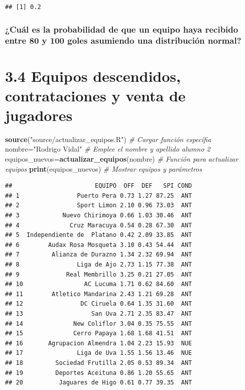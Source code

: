 \documentclass[]{article}
\newenvironment{Shaded}{\begin{snugshade}}{\end{snugshade}}
\newcommand{\CommentTok}[1]{\textcolor[rgb]{0.56,0.35,0.01}{\textit{#1}}}
\newcommand{\KeywordTok}[1]{\textcolor[rgb]{0.13,0.29,0.53}{\textbf{#1}}}
\newcommand{\NormalTok}[1]{#1}
\newcommand{\StringTok}[1]{\textcolor[rgb]{0.31,0.60,0.02}{#1}}
\begin{document}
\begin{verbatim}
## [1] 0.2
\end{verbatim}

\hypertarget{cual-es-la-probabilidad-de-que-un-equipo-haya-recibido-entre-80-y-100-goles-asumiendo-una-distribucion-normal}{%
\subsubsection{¿Cuál es la probabilidad de que un equipo haya recibido
entre 80 y 100 goles asumiendo una distribución
normal?}\label{cual-es-la-probabilidad-de-que-un-equipo-haya-recibido-entre-80-y-100-goles-asumiendo-una-distribucion-normal}}

\hypertarget{equipos-descendidos-contrataciones-y-venta-de-jugadores}{%
\section{3.4 Equipos descendidos, contrataciones y venta de
jugadores}\label{equipos-descendidos-contrataciones-y-venta-de-jugadores}}

\begin{Shaded}
\begin{Highlighting}[numbers=left,,]
\KeywordTok{source}\NormalTok{(}\StringTok{"source/actualizar_equipos.R"}\NormalTok{) }\CommentTok{# Cargar función específia}
\NormalTok{nombre=}\StringTok{"Rodrigo Vidal"} \CommentTok{# Emplee el nombre y apellido alumno 2}
\NormalTok{equipos_nuevos=}\KeywordTok{actualizar_equipos}\NormalTok{(nombre) }\CommentTok{# Función para actualizar equipos}
\KeywordTok{print}\NormalTok{(equipos_nuevos) }\CommentTok{# Mostrar equipos y parámetros}
\end{Highlighting}
\end{Shaded}

\begin{verbatim}
##                       EQUIPO  OFF  DEF   SPI COND
## 1                Puerto Pera 0.73 1.27 87.25  ANT
## 2                Sport Limon 2.10 0.96 73.03  ANT
## 3            Nuevo Chirimoya 0.66 1.03 30.46  ANT
## 4              Cruz Maracuya 0.54 0.28 67.30  ANT
## 5  Independiente de  Platano 0.42 2.09 33.85  ANT
## 6        Audax Rosa Mosqueta 3.10 0.43 54.44  ANT
## 7         Alianza de Durazno 1.34 2.32 69.94  ANT
## 8                Liga de Ajo 2.73 1.15 77.38  ANT
## 9             Real Membrillo 3.25 0.21 27.05  ANT
## 10                 AC Lucuma 1.71 0.62 84.60  ANT
## 11        Atletico Mandarina 2.43 1.21 69.28  ANT
## 12                DC Ciruela 0.64 1.35 31.60  ANT
## 13                   San Uva 2.71 2.35 83.47  ANT
## 14              New Coliflor 3.04 0.35 75.55  ANT
## 15              Cerro Papaya 1.68 1.68 41.51  ANT
## 16       Agrupacion Almendra 1.04 2.23 15.93  NUE
## 17               Liga de Uva 1.55 1.56 13.46  NUE
## 18         Sociedad Frutilla 2.05 0.53 89.34  ANT
## 19         Deportes Aceituna 0.86 1.20 55.65  ANT
## 20          Jaguares de Higo 0.61 0.77 39.35  ANT
\end{verbatim}
\end{document}
